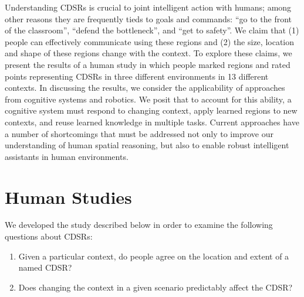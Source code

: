 \documentclass[11pt,letterpaper]{article}
\begin{document}
Understanding CDSRs is crucial to joint intelligent action with humans; among other reasons they are frequently tieds to goals and commands: ``go to the front of the classroom'', ``defend the bottleneck'', and ``get to safety''.  We claim that (1) people can effectively communicate using these regions and (2) the size, location and shape of these regions change with the context.  To explore these claims, we present the results of a human study in which people marked regions and rated points representing CDSRs in three different environments in 13 different contexts.  In discussing the results, we consider the applicability of approaches from cognitive systems and robotics.  We posit that to account for this ability, a cognitive system must respond to changing context, apply learned regions to new contexts, and reuse learned knowledge in multiple tasks.  Current approaches have a number of shortcomings that must be addressed not only to improve our understanding of human spatial reasoning, but also to enable robust intelligent assistants in human environments.



\section{Human Studies}

We developed the study described below in order to examine the following questions about CDSRs:
\begin{enumerate}
	\item Given a particular context, do people agree on the location and extent of a named CDSR?
	\item Does changing the context in a given scenario predictably affect the CDSR?
\end{enumerate}
\end{document}
